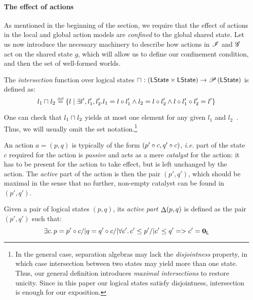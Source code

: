 \paragraph{The effect of actions} As mentioned in the beginning of the
section, we require that the effect of actions in the local and global action models are \emph{confined} to the global shared state.  Let us now introduce
the necessary machinery to describe how actions in $\mathscr{I}$ and $\mathscr{G}$
act on the shared state $g$, which will allow us to define our
confinement condition, and then the set of well-formed worlds.

\begin{definition}[Intersection]
The \emph{intersection} function over logical states 
$
\sqcap_{} : \left(\textsf{LState} \times \textsf{LState} \right) \rightarrow \mathscr{P}\left(\textsf{LState} \right)
$
is defined as:
\[
l_1 \sqcap_{} l_2 \mathrel{\stackrel{\smash{\scriptscriptstyle{\mathrm{def}}}}{=}} 
\left\{ 
l  \mid
\exists l', l_1', l_2'.\,\! l_1 = l \circ l_1' \land l_2 = l \circ l_2' \land l \circ l_1' \circ l_2' = l'
\right\}
\]
\end{definition}

One can check that $l_1\sqcap_{} l_2$ yields at most one element for any
given $l_1$ and $l_2$~\cite{colosl-tr14}. Thus, we will usually omit
the set notation.\footnote{In the general case, separation algebras
  may lack the \emph{disjointness} property, in which case
  intersection between two states may yield more than one state. Thus,
  our general definition introduces \emph{maximal intersections} to
  restore unicity. Since in this paper our logical states satisfy disjointness,
  intersection is enough for our exposition.}

An action $a = (p, q)$ is typically of the form $(p'\circ c,
q'\circ c)$, \textit{i.e.} part of the state $c$ required for
the action is \emph{passive} and acts as a mere \emph{catalyst} for
the action: it has to be present for the action to take effect, but is
left unchanged by the action. The \emph{active} part of the action is then
the pair $(p',q')$, which should be maximal in the sense that no
further, non-empty catalyst can be found in $(p',q')$.

\begin{definition}
  Given a pair of logical states $(p, q)$, its \emph{active part}
  $\mathop{\Delta} (p,q)$ is defined as the pair $(p', q')$ such that:
  \[
  \exists c.\, p = p' \circ c /| q = q' \circ c /| \forall c'.\, c'\leq p' /|
  c'\leq q' => c' = \mathbf{0}_{\textsf{L}}
  \]
\end{definition}

